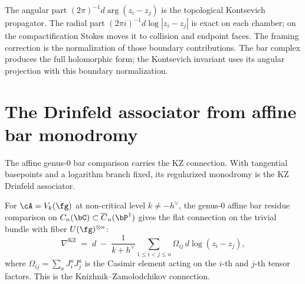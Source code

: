 \begin{remark}\label{rem:imaginary-part}
The angular part $(2\pi)^{-1}d\arg(z_i-z_j)$ is the topological Kontsevich
propagator. The radial part $(2\pi i)^{-1}d\log|z_i-z_j|$ is exact on each
chamber; on the compactification Stokes moves it to collision and endpoint
faces. The framing correction is the normalization of those boundary
contributions. The bar complex produces the full holomorphic form; the
Kontsevich invariant uses its angular projection with this boundary
normalization.
\end{remark}


\section{The Drinfeld associator from affine bar monodromy}
\label{sec:drinfeld-associator}

The affine genus-$0$ bar comparison carries the KZ connection. With tangential
basepoints and a logarithm branch fixed, its regularized monodromy is the KZ
Drinfeld associator.

\begin{proposition}
\label{prop:kz-from-bar}
For $\cA=V_k(\fg)$ at non-critical level $k\neq -h^\vee$, the
genus-$0$ affine bar residue comparison on
$C_n(\bC)\subset\overline{C}_n(\bP^1)$ gives the flat connection on
the trivial bundle with fiber $U(\fg)^{\otimes n}$:
\begin{equation}\label{eq:kz-connection}
\nabla^{\mathrm{KZ}}
\;=\;
d \;-\; \frac{1}{k+h^\vee}
\sum_{1 \leq i < j \leq n}
\Omega_{ij}\,d\log(z_i-z_j),
\end{equation}
where $\Omega_{ij} = \sum_a J^a_i J^a_j$ is the Casimir element
acting on the $i$-th and $j$-th tensor factors. This is the
Knizhnik--Zamolodchikov connection.
\end{proposition}

